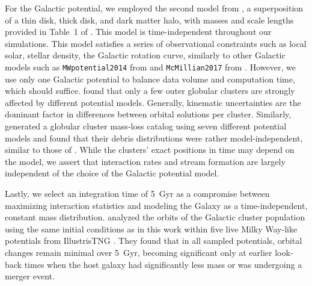 \documentclass{aa}
\begin{document}
    For the Galactic potential, we employed the second model from \citet{2017A&A...598A..66P}, a superposition of a thin disk, thick disk, and dark matter halo, with masses and scale lengths provided in Table~1 of \citet{2023A&A...673A..44F}. This model is time-independent throughout our simulations. This model satisfies a series of observational constraints such as local solar, stellar density, the Galactic rotation curve, similarly to other Galactic models such as \texttt{MWpotential2014} from \citet{2015ApJS..216...29B} and \texttt{McMillian2017} from \citet{2017MNRAS.465...76M}. However, we use only one Galactic potential to balance data volume and computation time, which should suffice. \citet{2021MNRAS.505.5978V} found that only a few outer globular clusters are strongly affected by different potential models. Generally, kinematic uncertainties are the dominant factor in differences between orbital solutions per cluster. Similarly, \citet{2024MNRAS.528.5189G} generated a globular cluster mass-loss catalog using seven different potential models and found that their debris distributions were rather model-independent, similar to those of \citet{2023A&A...673A..44F}. While the clusters' exact positions in time may depend on the model, we assert that interaction rates and stream formation are largely independent of the choice of the Galactic potential model.
    
    Lastly, we select an integration time of 5~Gyr as a compromise between maximizing interaction statistics and modeling the Galaxy as a time-independent, constant mass distribution. \citet{2023A&A...673A.152I} analyzed the orbits of the Galactic cluster population using the same initial conditions as in this work within five live Milky Way-like potentials from IllustrisTNG \citep{2018MNRAS.473.4077P}. They found that in all sampled potentials, orbital changes remain minimal over 5~Gyr, becoming significant only at earlier look-back times when the host galaxy had significantly less mass or was undergoing a merger event.
\end{document}
